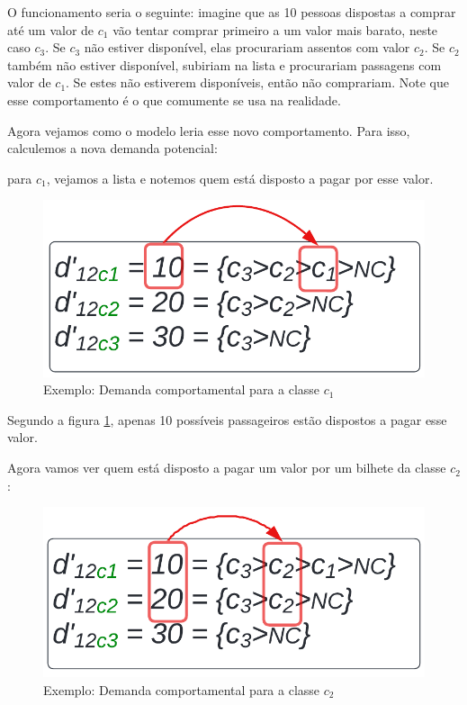 O funcionamento seria o seguinte: imagine que as 10 pessoas dispostas a comprar até um valor de $c_1$ vão tentar comprar primeiro a um valor mais barato, neste caso $c_3$. Se $c_3$ não estiver disponível, elas procurariam assentos com valor $c_2$. Se $c_2$ também não estiver disponível, subiriam na lista e procurariam passagens com valor de $c_1$. Se estes não estiverem disponíveis, então não comprariam. Note que esse comportamento é o que comumente se usa na realidade.

Agora vejamos como o modelo leria esse novo comportamento. Para isso, calculemos a nova demanda potencial: 

para $c_1$, vejamos a lista e notemos quem está disposto a pagar por esse valor.
\begin{figure}[H]
	\begin{center}
		\includegraphics[scale=0.24]{img/dem_compo_c1.png}
		\caption{Exemplo: Demanda comportamental para a classe $c_1$}
		\label{fig: exemplo_dem_c1}
	\end{center}
\end{figure}

Segundo a figura \ref{fig: exemplo_dem_c1}, apenas 10 possíveis passageiros estão dispostos a pagar esse valor.

Agora vamos ver quem está disposto a pagar um valor por um bilhete da classe $c_2$:
\begin{figure}[H]
	\begin{center}
		\includegraphics[scale=0.24]{img/dem_compo_c2.png}
		\caption{Exemplo: Demanda comportamental para a classe $c_2$}
		\label{fig: exemplo_dem_c2}
	\end{center}
\end{figure}

